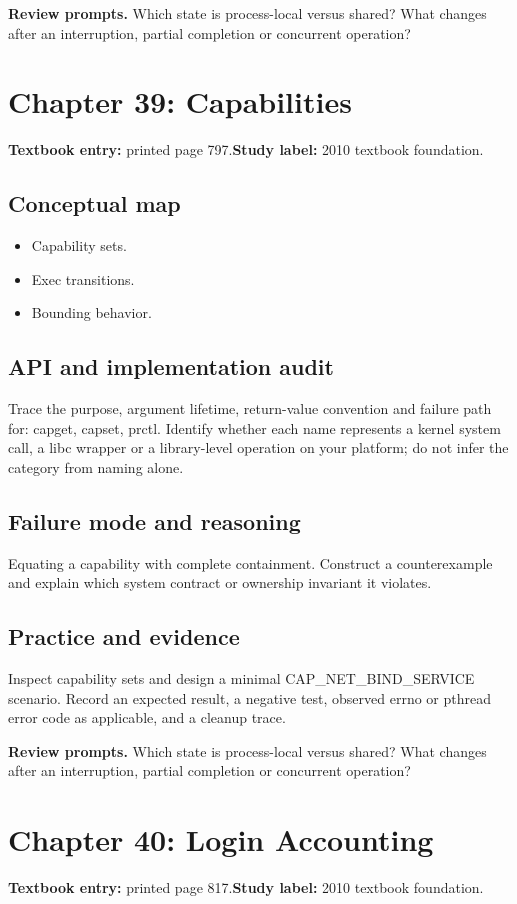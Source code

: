 \documentclass[11pt,letterpaper,oneside]{report}
\begin{document}
\textbf{Review prompts.} Which state is process-local versus shared? What changes after an interruption, partial completion or concurrent operation?

\section{Chapter 39: Capabilities}
\textbf{Textbook entry:} printed page 797.\quad \textbf{Study label:} 2010 textbook foundation.

\subsection{Conceptual map}
\begin{itemize}
\item Capability sets.
\item Exec transitions.
\item Bounding behavior.
\end{itemize}
\subsection{API and implementation audit}
Trace the purpose, argument lifetime, return-value convention and failure path for: capget, capset, prctl. Identify whether each name represents a kernel system call, a libc wrapper or a library-level operation on your platform; do not infer the category from naming alone.

\subsection{Failure mode and reasoning}
Equating a capability with complete containment. Construct a counterexample and explain which system contract or ownership invariant it violates.

\subsection{Practice and evidence}
Inspect capability sets and design a minimal CAP\_NET\_BIND\_SERVICE scenario. Record an expected result, a negative test, observed errno or pthread error code as applicable, and a cleanup trace.

\textbf{Review prompts.} Which state is process-local versus shared? What changes after an interruption, partial completion or concurrent operation?

\section{Chapter 40: Login Accounting}
\textbf{Textbook entry:} printed page 817.\quad \textbf{Study label:} 2010 textbook foundation.
\end{document}
